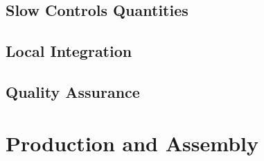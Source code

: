 \subsection{Slow Controls Quantities}
\label{sec:fdsp-slow-cryo-quant}

\subsection{Local Integration}
\label{sec:fdsp-slow-cryo-slow-loc-integ}

\subsection{Quality Assurance}
\label{sec:fdsp-slow-cryo-slow-qa}


\section{Production and Assembly}
\label{sec:fdsp-slow-cryo-prod-assy}


